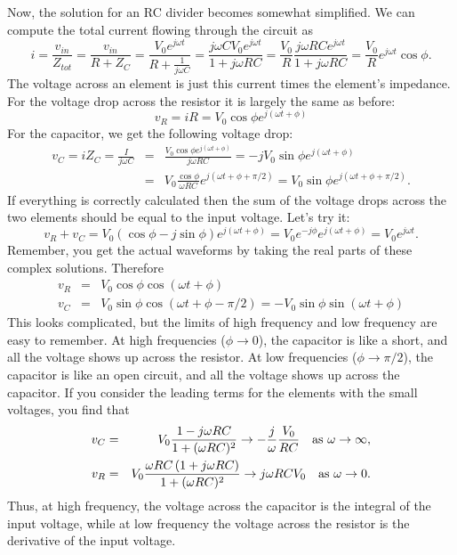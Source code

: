 \documentclass{article}
\begin{document}
Now, the solution for an RC divider becomes somewhat simplified. We can compute the total current flowing through the circuit as
\begin{equation}
i = \frac{v_{in}}{Z_{tot}} = \frac{v_{in}}{R + Z_C} = \frac{V_0 e^{j\omega t}}{R + \frac{1}{j\omega C}} = \frac{j\omega C V_0 e^{j\omega t}}{1 + j\omega RC} = \frac{V_0}{R} \frac{j\omega RC e^{j\omega t}}{1 + j\omega RC} = \frac{V_0}{R} e^{j\omega t}  \cos\phi.
\end{equation}
The voltage across an element is just this current times the element's impedance. For the
voltage drop across the resistor it is largely the same as before:
\begin{equation}
v_R = i R = V_0 \cos\phi e^{j\left(\omega t + \phi\right)}
\end{equation}
For the capacitor, we get the following voltage drop:
\begin{eqnarray}
v_C = i Z_C = \frac{I}{j\omega C} & = & \frac{V_0 \cos\phi e^{j\left(\omega t + \phi\right)}}{j\omega RC} = -j V_0 \sin\phi e^{j\left(\omega t + \phi\right)} \\
& = & V_0 \frac{\cos\phi}{\omega RC} e^{j\left(\omega t + \phi + \pi/2\right)} = V_0 \sin\phi e^{j\left(\omega t + \phi + \pi/2\right)}.
\end{eqnarray}
If everything is correctly calculated then the sum of the voltage drops across the two elements should be equal to the input voltage. Let's try it:
\begin{equation}
v_R + v_C = V_0 \left( \cos\phi - j\sin\phi \right) e^{j\left(\omega t + \phi\right)} = V_0 e^{-j\phi} e^{j\left(\omega t + \phi\right)} = V_0 e^{j\omega t}.
\end{equation}
Remember, you get the actual waveforms by taking the real parts of these complex solutions. Therefore
\begin{eqnarray}
v_R & = & V_0 \cos\phi \cos(\omega t + \phi) \\
v_C & = & V_0 \sin\phi \cos(\omega t + \phi - \pi/2) = - V_0 \sin\phi \sin(\omega t + \phi)
\end{eqnarray}
This looks complicated, but the limits of high frequency and low frequency are easy to remember. At high frequencies ($\phi \to 0$), the capacitor is like a short, and all the voltage shows up across the resistor. At low frequencies ($\phi \to \pi/2$), the capacitor is like an open circuit, and all the voltage shows up across the capacitor.
If you consider the leading terms for the elements with the small voltages, you find that
\begin{eqnarray}
v_C & = & V_0 \frac{1 - j\omega RC}{1 + (\omega RC)^2} \to -\frac{j}{\omega} \frac{V_0}{RC} \quad \hbox{as}~\omega \to \infty, \\
v_R & = & V_0 \frac{\omega RC \left(1 + j\omega RC\right)}{1 + (\omega RC)^2} \to j\omega RC V_0 \quad \hbox{as}~\omega \to 0.
\end{eqnarray}
Thus, at high frequency, the voltage across the capacitor is the integral of the input voltage, while at low frequency the voltage across the resistor is the derivative of the input voltage. 
\end{document}
